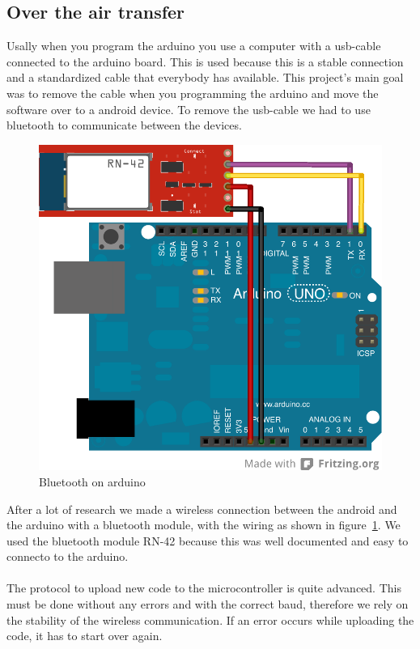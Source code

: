 \subsection{Over the air transfer}
Usally when you program the arduino you use a computer with a usb-cable connected to the arduino board. This is used because this is a stable connection and a standardized cable that everybody has available. This project's main goal was to remove the cable when you programming the arduino and move the software over to a android device. To remove the usb-cable we had to use bluetooth to communicate between the devices.
\\
\begin{figure}[H]
\includegraphics[scale=1.2]{images/wiring_simple.png}
\caption{Bluetooth on arduino}
\label{fig:SimpleArduinoWiring}
\end{figure}

After a lot of research we made a wireless connection between the android and the arduino with a bluetooth module, with the wiring as shown in figure~\ref{fig:SimpleArduinoWiring}. We used the bluetooth module RN-42 because this was well documented and easy to connecto to the arduino.\\
\\
The protocol to upload new code to the microcontroller is quite advanced. This must be done without any errors and with the correct baud, therefore we rely on the stability of the wireless communication. If an error occurs while uploading the code, it has to start over again.
